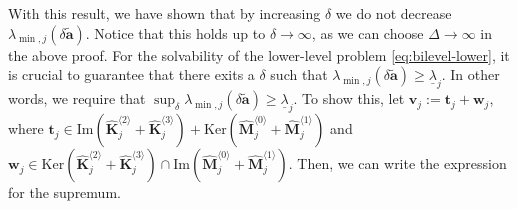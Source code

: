 \documentclass[final,onefignum,onetabnum]{siamart220329}
\begin{document}
With this result, we have shown that by increasing $\delta$ we do not decrease $\lambda_{\min,j}(\delta \tilde{\mathbf{a}})$. {Notice that this holds up to $\delta\rightarrow \infty$, as we can choose $\Delta\rightarrow \infty$ in the above proof.} For the solvability of the lower-level problem \eqref{eq:bilevel-lower}, it is crucial to guarantee that there exits a $\delta$ such that $\lambda_{\min,j}(\delta \tilde{\mathbf{a}}) \ge \underline{\lambda}_j$. In other words, we require that $\sup_{\delta} \lambda_{\min,j}(\delta \tilde{\mathbf{a}}) \ge \underline{\lambda}_j$. To show this, let $\mathbf{v}_j := \mathbf{t}_j + \mathbf{w}_j$, where $\mathbf{t}_j \in \mathrm{Im}\left(\hat{\mathbf{K}}_j^{\langle 2\rangle} + \hat{\mathbf{K}}_j^{\langle 3\rangle}\right) + \mathrm{Ker}\left(\hat{\mathbf{M}}_j^{\langle 0\rangle} + \hat{\mathbf{M}}_j^{\langle 1\rangle}\right) $ and $\mathbf{w}_j \in \mathrm{Ker}\left(\hat{\mathbf{K}}_j^{\langle 2\rangle} + \hat{\mathbf{K}}_j^{\langle 3\rangle}\right) \cap \mathrm{Im}\left(\hat{\mathbf{M}}_j^{\langle 0\rangle} + \hat{\mathbf{M}}_j^{\langle 1\rangle}\right)$.
Then, we can write the expression for the supremum.
\end{document}
